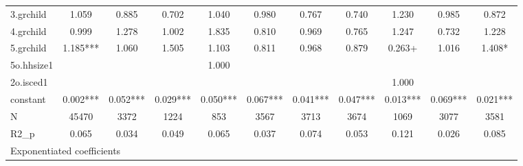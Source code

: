 {\begin{tabular}{l*{10}{c}}
3.grchild   &       1.059   &       0.885   &       0.702   &       1.040   &       0.980   &       0.767   &       0.740   &       1.230   &       0.985   &       0.872   \\
4.grchild   &       0.999   &       1.278   &       1.002   &       1.835   &       0.810   &       0.969   &       0.765   &       1.247   &       0.732   &       1.228   \\
5.grchild   &       1.185***&       1.060   &       1.505   &       1.103   &       0.811   &       0.968   &       0.879   &       0.263+  &       1.016   &       1.408*  \\
5o.hhsize1  &               &               &               &       1.000   &               &               &               &               &               &               \\
2o.isced1   &               &               &               &               &               &               &               &       1.000   &               &               \\
constant    &       0.002***&       0.052***&       0.029***&       0.050***&       0.067***&       0.041***&       0.047***&       0.013***&       0.069***&       0.021***\\
\hline
N           &       45470   &        3372   &        1224   &         853   &        3567   &        3713   &        3674   &        1069   &        3077   &        3581   \\
R2\_p        &       0.065   &       0.034   &       0.049   &       0.065   &       0.037   &       0.074   &       0.053   &       0.121   &       0.026   &       0.085   \\
\hline\hline
\multicolumn{11}{l}{\footnotesize Exponentiated coefficients}\\
\end{tabular}
}
